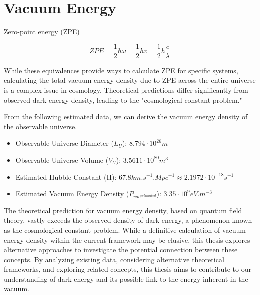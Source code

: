 \section{Vacuum Energy}

Zero-point energy (ZPE)

\[ ZPE = \frac{1}{2} \hbar \omega = \frac{1}{2} hv = \frac{1}{2} h \frac{c}{\lambda} \]

While these equivalences provide ways to calculate ZPE for specific systems, calculating the total vacuum energy density due to ZPE across the entire universe is a complex issue in cosmology. Theoretical predictions differ significantly from observed dark energy density, leading to the "cosmological constant problem."

From the following estimated data, we can derive the vacuum energy density of the observable universe.

\begin{itemize}
    \item Observable Universe Diameter (\(L_{U}\)): \( 8.794 \cdot 10^{26} \si{m} \)
    \item Observable Universe Volume (\(V_{U}\)): \( 3.5611 \cdot 10^{80} \si{m^{3}} \)
    \item Estimated Hubble Constant (H): \( 67.8 \si{km.s^{-1}.Mpc^{-1}} \approx 2.1972 \cdot 10^{-18} \si{s^{-1}} \)
    \item Estimated Vacuum Energy Density (\(P_{vac^{estimated}}\)): \( 3.35 \cdot 10^{9} \si{eV.m^{-3}} \)
\end{itemize}

The theoretical prediction for vacuum energy density, based on quantum field theory, vastly exceeds the observed density of dark energy, a phenomenon known as the cosmological constant problem.  While a definitive calculation of vacuum energy density within the current framework may be elusive, this thesis explores alternative approaches to investigate the potential connection between these concepts.  By analyzing existing data, considering alternative theoretical frameworks, and exploring related concepts, this thesis aims to contribute to our understanding of dark energy and its possible link to the energy inherent in the vacuum.

